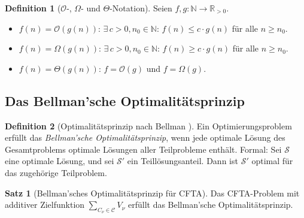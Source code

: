 \documentclass[a4paper,12pt]{article}
\theoremstyle{definition}
\newtheorem{definition}{Definition}
\newtheorem{satz}{Satz}
\begin{document}
\begin{definition}[$\mathcal{O}$-, $\Omega$- und $\Theta$-Notation]
    Seien $f, g: \mathbb{N} \to \mathbb{R}_{>0}$.
    \begin{itemize}
        \item $f(n) = \mathcal{O}(g(n))$: $\exists\, c > 0, n_0 \in \mathbb{N}$:
              $f(n) \leq c \cdot g(n)$ f\"{u}r alle $n \geq n_0$.
        \item $f(n) = \Omega(g(n))$: $\exists\, c > 0, n_0 \in \mathbb{N}$:
              $f(n) \geq c \cdot g(n)$ f\"{u}r alle $n \geq n_0$.
        \item $f(n) = \Theta(g(n))$: $f = \mathcal{O}(g)$ und $f = \Omega(g)$.
    \end{itemize}
\end{definition}

\subsection{Das Bellman'sche Optimalit\"{a}tsprinzip}

\begin{definition}[Optimalit\"{a}tsprinzip nach Bellman \cite{bellman1957}]
    Ein Optimierungsproblem erf\"{u}llt das \emph{Bellman'sche Optimalit\"{a}tsprinzip},
    wenn jede optimale L\"{o}sung des Gesamtproblems optimale L\"{o}sungen aller
    Teilprobleme enth\"{a}lt. Formal: Sei $\mathcal{S}$ eine optimale L\"{o}sung,
    und sei $\mathcal{S}'$ ein Teill\"{o}sungsanteil. Dann ist $\mathcal{S}'$
    optimal f\"{u}r das zugeh\"{o}rige Teilproblem.
\end{definition}

\begin{satz}[Bellman'sches Optimalit\"{a}tsprinzip f\"{u}r CFTA]
    \label{satz:bellman_cfta}
    Das CFTA-Problem mit additiver Zielfunktion
    $\sum_{C_\nu \in \mathcal{C}} V_\nu$ erf\"{u}llt das Bellman'sche
    Optimalit\"{a}tsprinzip.
\end{satz}
\end{document}
